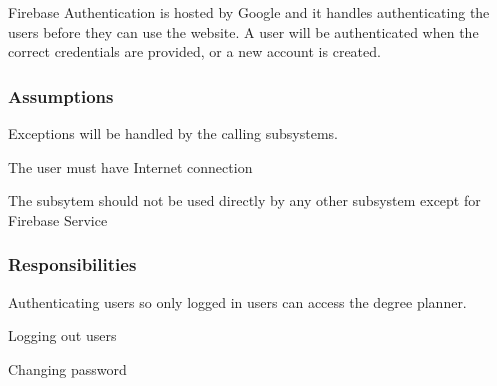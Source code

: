 Firebase Authentication is hosted by Google and it handles authenticating the users before they can use the website.
A user will be authenticated when the correct credentials are provided, or a new account is created.

\subsubsection{Assumptions}
\begin{itemize}
    \begin{item}
          Exceptions will be handled by the calling subsystems.
    \end{item}
    \begin{item}
          The user must have Internet connection
    \end{item}
    \begin{item}
          The subsytem should not be used directly by any other subsystem except for Firebase Service
    \end{item}
\end{itemize}

\subsubsection{Responsibilities}
\begin{itemize}
    \begin{item}
          Authenticating users so only logged in users can access the degree planner.
    \end{item}
    \begin{item}
          Logging out users
    \end{item}
    \begin{item}
          Changing password
    \end{item}
\end{itemize}

